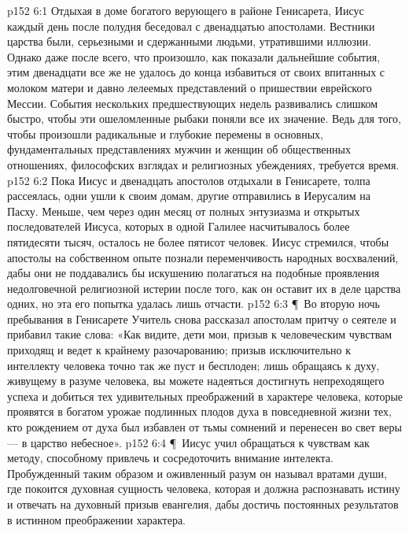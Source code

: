 \vs p152 6:1 Отдыхая в доме богатого верующего в районе Генисарета, Иисус каждый день после полудня беседовал с двенадцатью апостолами. Вестники царства были, серьезными и сдержанными людьми, утратившими иллюзии. Однако даже после всего, что произошло, как показали дальнейшие события, этим двенадцати все же не удалось до конца избавиться от своих впитанных с молоком матери и давно лелеемых представлений о пришествии еврейского Мессии. События нескольких предшествующих недель развивались слишком быстро, чтобы эти ошеломленные рыбаки поняли все их значение. Ведь для того, чтобы произошли радикальные и глубокие перемены в основных, фундаментальных представлениях мужчин и женщин об общественных отношениях, философских взглядах и религиозных убеждениях, требуется время.
\vs p152 6:2 Пока Иисус и двенадцать апостолов отдыхали в Генисарете, толпа рассеялась, одни ушли к своим домам, другие отправились в Иерусалим на Пасху. Меньше, чем через один месяц от полных энтузиазма и открытых последователей Иисуса, которых в одной Галилее насчитывалось более пятидесяти тысяч, осталось не более пятисот человек. Иисус стремился, чтобы апостолы на собственном опыте познали переменчивость народных восхвалений, дабы они не поддавались бы искушению полагаться на подобные проявления недолговечной религиозной истерии после того, как он оставит их в деле царства одних, но эта его попытка удалась лишь отчасти.
\vs p152 6:3 \P\ Во вторую ночь пребывания в Генисарете Учитель снова рассказал апостолам притчу о сеятеле и прибавил такие слова: «Как видите, дети мои, призыв к человеческим чувствам приходящ и ведет к крайнему разочарованию; призыв исключительно к интеллекту человека точно так же пуст и бесплоден; лишь обращаясь к духу, живущему в разуме человека, вы можете надеяться достигнуть непреходящего успеха и добиться тех удивительных преображений в характере человека, которые проявятся в богатом урожае подлинных плодов духа в повседневной жизни тех, кто рождением от духа был избавлен от тьмы сомнений и перенесен во свет веры --- в царство небесное».
\vs p152 6:4 \P\ Иисус учил обращаться к чувствам как методу, способному привлечь и сосредоточить внимание интелекта. Пробужденный таким образом и оживленный разум он называл вратами души, где покоится духовная сущность человека, которая и должна распознавать истину и отвечать на духовный призыв евангелия, дабы достичь постоянных результатов в истинном преображении характера.

